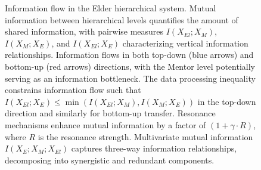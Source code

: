 \begin{figure}[t]
\begin{tikzpicture}[scale=0.85, transform shape]
\end{tikzpicture}
\caption{Information flow in the Elder hierarchical system. Mutual information between hierarchical levels quantifies the amount of shared information, with pairwise measures $I(X_{El}; X_M)$, $I(X_M; X_E)$, and $I(X_{El}; X_E)$ characterizing vertical information relationships. Information flows in both top-down (blue arrows) and bottom-up (red arrows) directions, with the Mentor level potentially serving as an information bottleneck. The data processing inequality constrains information flow such that $I(X_{El}; X_E) \leq \min(I(X_{El}; X_M), I(X_M; X_E))$ in the top-down direction and similarly for bottom-up transfer. Resonance mechanisms enhance mutual information by a factor of $(1 + \gamma \cdot R)$, where $R$ is the resonance strength. Multivariate mutual information $I(X_E; X_M; X_{El})$ captures three-way information relationships, decomposing into synergistic and redundant components.}
\label{fig:hierarchical_mutual_information}
\end{figure}